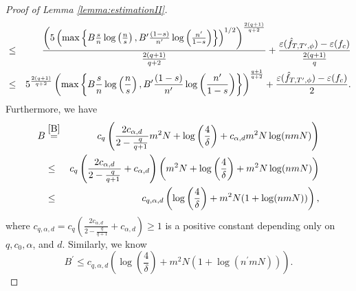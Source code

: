 \documentclass[10pt,a4paper]{amsart}
\begin{document}
\begin{proof}[Proof of Lemma \ref{lemma:estimationII}]
\begin{eqnarray}
&\leq&   \frac{\left( 5\left(  \max\left\{ B \frac{s}{n}
\log \left(\frac{n}{s}\right),B^\prime \frac{(1-s)}{n^\prime}\log \left(\frac{n^\prime}{1-s}\right) \right\} \right)^{1/2}\right)^{\frac{2(q+1)}{q+2}}}{\frac{2(q+1)}{q+2}} + \frac{\varepsilon (\Hat{f}_{T, T^\prime,\phi}) - \varepsilon (f_c)}{\frac{2(q+1)}{q}} \nonumber\\
&\leq&5^{\frac{2(q+1)}{q+2}} \left(  \max\left\{  B\frac{s}{n}
\log \left(\frac{n}{s}\right), B^\prime \frac{(1-s)}{n^\prime}\log \left(\frac{n^\prime}{1-s}\right) \right\} \right)^{\frac{q+1}{q+2}} + \frac{\varepsilon (\Hat{f}_{T, T^\prime,\phi}) - \varepsilon (f_c)}{2}.
\end{eqnarray}
Furthermore, we have 
\begin{eqnarray}\label{Bbound}
    B&\stackrel{\eqref{B}}{=}&c_{q} \left(\frac{2c_{\alpha, d}}{2-{\frac{q}{q+1}}} m^2 N + \log \left(\frac{4}{\delta}\right) + c_{\alpha, d} m^2 N\log(nmN)\right) \nonumber\\
    &\leq& c_{q} \left(\frac{2c_{\alpha, d}}{2-{\frac{q}{q+1}}} + c_{\alpha, d}\right)\left(m^2 N + \log \left(\frac{4}{\delta}\right) + m^2 N\log(nmN)\right)\nonumber\\
     &\leq&  c_{q,\alpha,d}\left(\log \left(\frac{4}{\delta}\right) + m^2 N (1+\log(nmN))\right),
\end{eqnarray}
where $c_{q,\alpha, d} = c_{q} \left(\frac{2c_{\alpha, d}}{2-{\frac{q}{q+1}}} + c_{\alpha, d}\right) \geq 1$ is a positive constant depending only on $q, c_0 , \alpha$, and $d$. 
Similarly, we know 
\begin{equation}\label{Bprimebound}
    B^\prime \leq  c_{q,\alpha,d}\left(\log \left(\frac{4}{\delta}\right) + m^2 N (1+\log(n^\prime mN))\right). 
\end{equation}
 

\end{proof}
\end{document}
